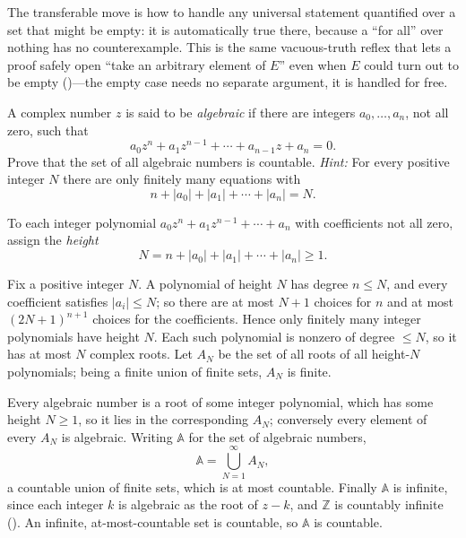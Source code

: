 \documentclass[main.tex]{subfiles}
\begin{document}
\begin{Reflection}
The transferable move is how to handle any universal statement quantified over a set that might be
empty: it is automatically true there, because a ``for all'' over nothing has no counterexample. This
is the same vacuous-truth reflex that lets a proof safely open ``take an arbitrary element of $E$''
even when $E$ could turn out to be empty ()---the empty case needs no separate argument,
it is handled for free.
\end{Reflection}

A complex number $z$ is said to be \emph{algebraic} if there are integers $a_0,\dots,a_n$, not all
zero, such that
\[
a_0z^n+a_1z^{n-1}+\cdots+a_{n-1}z+a_n=0.
\]
Prove that the set of all algebraic numbers is countable. \emph{Hint:} For every positive integer $N$
there are only finitely many equations with
\[
n+|a_0|+|a_1|+\cdots+|a_n|=N.
\]

\begin{SolutionBlue}
To each integer polynomial $a_0z^n+a_1z^{n-1}+\cdots+a_n$ with coefficients not all zero, assign the
\emph{height}
\[
N=n+|a_0|+|a_1|+\cdots+|a_n|\ge 1.
\]

Fix a positive integer $N$. A polynomial of height $N$ has degree $n\le N$, and every coefficient
satisfies $|a_i|\le N$; so there are at most $N+1$ choices for $n$ and at most $(2N+1)^{n+1}$ choices
for the coefficients. Hence only finitely many integer polynomials have height $N$. Each such
polynomial is nonzero of degree $\le N$, so it has at most $N$ complex roots. Let $A_N$ be the set of
all roots of all height-$N$ polynomials; being a finite union of finite sets, $A_N$ is finite.

Every algebraic number is a root of some integer polynomial, which has some height $N\ge 1$, so it
lies in the corresponding $A_N$; conversely every element of every $A_N$ is algebraic. Writing
$\mathbb{A}$ for the set of algebraic numbers,
\[
\mathbb{A}=\bigcup_{N=1}^{\infty}A_N,
\]
a countable union of finite sets, which is at most countable. Finally $\mathbb{A}$ is infinite, since
each integer $k$ is algebraic as the root of $z-k$, and $\mathbb{Z}$ is countably infinite
(). An infinite, at-most-countable set is countable, so $\mathbb{A}$ is countable.
\end{SolutionBlue}
\end{document}
